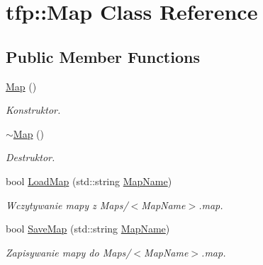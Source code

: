 \hypertarget{classtfp_1_1_map}{}\section{tfp\+:\+:Map Class Reference}
\label{classtfp_1_1_map}
\subsection*{Public Member Functions}
\begin{DoxyCompactItemize}
\item 
\mbox{\label{classtfp_1_1_map_ae5e9a20788ab2ff4535460d99ff7fb6c}} 
\mbox{\hyperlink{classtfp_1_1_map_ae5e9a20788ab2ff4535460d99ff7fb6c}{Map}} ()
\begin{DoxyCompactList}\small\item\em Konstruktor. \end{DoxyCompactList}\item 
\mbox{\label{classtfp_1_1_map_ae24ec4d4d2fc21921d43d9804bbd9d96}} 
\mbox{\hyperlink{classtfp_1_1_map_ae24ec4d4d2fc21921d43d9804bbd9d96}{$\sim$\+Map}} ()
\begin{DoxyCompactList}\small\item\em Destruktor. \end{DoxyCompactList}\item 
\mbox{\label{classtfp_1_1_map_ac7b5fb73c2988789b2dde5458014448a}} 
bool \mbox{\hyperlink{classtfp_1_1_map_ac7b5fb73c2988789b2dde5458014448a}{Load\+Map}} (std\+::string \mbox{\hyperlink{classtfp_1_1_map_a0a22afd5614529f2e8d1f1fcc812233e}{Map\+Name}})
\begin{DoxyCompactList}\small\item\em Wczytywanie mapy z Maps/$<$\+Map\+Name$>$.map. \end{DoxyCompactList}\item 
bool \mbox{\hyperlink{classtfp_1_1_map_ac717f2886ffd75c4e40df02c41379eb5}{Save\+Map}} (std\+::string \mbox{\hyperlink{classtfp_1_1_map_a0a22afd5614529f2e8d1f1fcc812233e}{Map\+Name}})
\begin{DoxyCompactList}\small\item\em Zapisywanie mapy do Maps/$<$\+Map\+Name$>$.map. \end{DoxyCompactList}\item 
\mbox{\label{classtfp_1_1_map_a056da797998341abcb3cce036d2533cf}} 

\end{DoxyCompactItemize}
